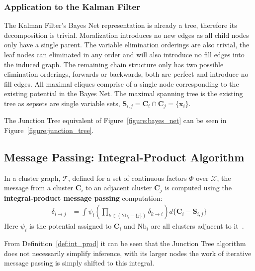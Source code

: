 \subsubsection{Application to the Kalman Filter}
\label{section:kalman_filter}
The Kalman Filter's Bayes Net representation is already a tree, therefore its decomposition is trivial. Moralization introduces no new edges as all child nodes only have a single parent. The variable elimination orderings are also trivial, the leaf nodes can eliminated in any order and will also introduce no fill edges into the induced graph. The remaining chain structure only has two possible elimination orderings, forwards or backwards, both are perfect and introduce no fill edges. All maximal cliques comprise of a single node corresponding to the existing potential in the Bayes Net. The maximal spanning tree is the existing tree as sepsets are single variable sets, $\pmb{S}_{i, j} = \pmb{C}_{i} \cap \pmb{C}_{j} = \{ \pmb{x}_{i} \} $.

The Junction Tree equivalent of Figure~\ref{figure:bayes_net} can be seen in Figure~\ref{figure:junction_tree}.



\subsection{Message Passing: Integral-Product Algorithm}
\label{subsection:message_passing}
 
\begin{definition}  \label{def:int_prod}
In a cluster graph, $\mathcal{T}$, defined for a set of continuous factors $\Phi$ over $\mathcal{X}$, the message from a cluster $\pmb{C}_{i}$ to an adjacent cluster $\pmb{C}_{j}$ is computed using the \textbf{integral-product message passing} computation:
\begin{align}
\delta_{i \rightarrow j} &= \int \psi_{i} \left( \prod_{k \in \left( \mbox{Nb}_{i} - \{ j \} \right)} \delta_{k \rightarrow i} \right) d\{ {\pmb{C}_{i} - \pmb{S}_{i, j}} \} \label{eqn:int_prod}
\end{align}
Here $\psi_{i}$ is the potential assigned to $\pmb{C}_{i}$ and $\mbox{Nb}_{i}$ are all clusters adjacent to it~\cite{Barber_junction_tree, Koller_clique_trees, Koller_canonical}.
\end{definition}
From Definition~\ref{def:int_prod} it can be seen that the Junction Tree algorithm does not necessarily simplify inference, with its larger nodes the work of iterative message passing is simply shifted to this integral.


